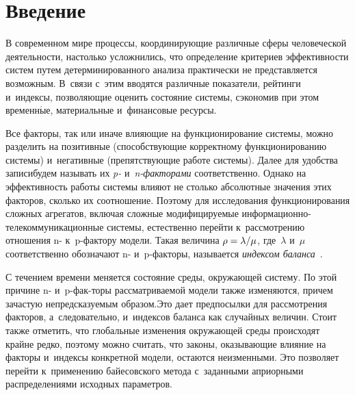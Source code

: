 
  
\vspace*{12pt}



\thispagestyle{headings}

\begin{multicols}{2}

\label{st\stat}

\section{Введение}

В современном мире процессы, ко\-ор\-ди\-ни\-ру\-ющие различные сферы человеческой 
де\-я\-тель\-ности, настолько усложнились, что определение критериев эффективности 
сис\-тем путем детерминированного анализа практически не представляется возможным. 
В~связи с~этим вводятся различные показатели, рейтинги и~индексы, позволяющие 
оценить состояние сис\-те\-мы, сэкономив при этом временн$\acute{\mbox{ы}}$е, материальные 
и~финансовые ре\-сурсы.

Все факторы, так или иначе влияющие на функциониро\-вание системы, можно разделить 
на позитивные (спо\-соб\-ст\-ву\-ющие корректному функционированию системы) и~негативные 
(пре\-пят\-ст\-ву\-ющие работе сис\-те\-мы). Далее для удобства записи\linebreak будем называть их 
{\it p-} и~{\it n-фак\-то\-ра\-ми} соответственно. 
Однако на эффективность 
работы системы влияют не столько абсолютные значения этих факторов, сколько их 
соотношение. Поэтому для исследования функционирования сложных агрегатов, 
включая сложные мо\-ди\-фи\-ци\-ру\-емые 
ин\-фор\-ма\-ци\-он\-но-те\-ле\-ком\-му\-ни\-ка\-ци\-он\-ные сис\-те\-мы, 
естественно перейти к~рассмотрению отношения n- к~p-фак\-то\-ру модели. Такая 
величина $\rho \hm= \lambda/\mu$, где~$\lambda$ и~$\mu$ соответственно обозначают 
n- и~p-фак\-то\-ры, называется {\it индексом баланса}~\cite{Ku2018}.

С течением времени меняется состояние среды, окружающей систему. По этой причине 
n- и~p-фак-\linebreak то\-ры рассматриваемой модели также изменяются, причем зачастую 
непредсказуемым образом.\linebreak Это дает предпосылки для рассмотрения факторов, 
а~следовательно, и~индексов баланса как случайных величин. Стоит также отметить, 
что глобальные изменения окружающей среды происходят крайне редко, поэтому можно 
считать, что законы, оказывающие влияние на факторы и~индексы конкретной модели, 
остаются неизменными. Это позволяет перейти к~применению байесовского метода 
с~заданными априорными распределениями исходных параметров.


\end{multicols}
